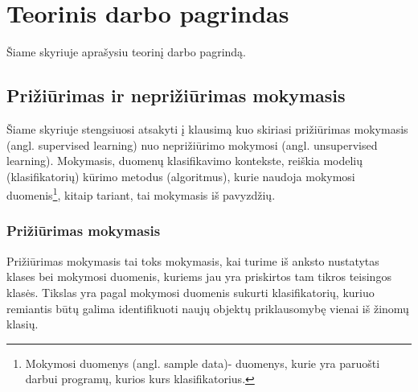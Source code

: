 \section{Teorinis darbo pagrindas}
Šiame skyriuje aprašysiu teorinį darbo pagrindą.
\begin{comment}
TODO Pakeisti prižiūrimą mokymasi į mokymasi su mokytoju
TODO Pakiesti neprižiūrimą mokymasi į mokymasi be mokytojo
\end{comment}
\subsection{Prižiūrimas ir neprižiūrimas mokymasis}

Šiame skyriuje stengsiuosi atsakyti į klausimą kuo skiriasi prižiūrimas mokymasis
(angl. supervised learning) nuo neprižiūrimo mokymosi (angl. unsupervised
learning). Mokymasis, duomenų klasifikavimo kontekste, reiškia modelių
(klasifikatorių) kūrimo metodus (algoritmus), kurie naudoja
mokymosi duomenis\footnote{Mokymosi duomenys (angl. sample data)- duomenys,
kurie yra paruošti darbui programų, kurios kurs klasifikatorius.}, kitaip
tariant, tai mokymasis iš pavyzdžių.

\subsubsection{Prižiūrimas mokymasis}

Prižiūrimas mokymasis tai toks mokymasis, kai turime iš anksto nustatytas
klases bei mokymosi duomenis, kuriems jau yra priskirtos tam tikros
teisingos klasės. Tikslas yra pagal mokymosi duomenis sukurti klasifikatorių,
kuriuo remiantis būtų galima identifikuoti naujų objektų priklausomybę vienai iš
žinomų klasių.\cite{markhall99}


\begin{comment}
Prižiūrimojo mokymosi esmė: turime aibę duomenų, kurios objektai yra vadinami
įėjimo duomenimis (angl. Input) arba nepriklausomais kintamaisiais (angl.
Independent variables), jų reikšmės yra išmatuotos arba nustatytos. Darome prielaidą, 
kad nepriklausomi kintamieji turi įtakos vienam ar daugiau rezultato kintamųjų 
(angl. Output) arba priklausomų kintamųjų (angl. Dependent variables). Paėmus dar vieną 
duomenų objektą (angl. Tuple), tikslas yra pagal nepriklausomus kintamuosius nuspėti priklausomus kintamuosius.
\end{comment}

